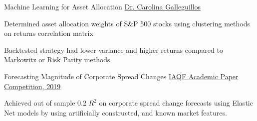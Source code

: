 \documentclass[10pt]{article}
\begin{document}
\headedsectiontwo
{Machine Learning for Asset Allocation}{}
{\href{https://www.linkedin.com/in/carolinagalleguillos/}{Dr. Carolina Galleguillos}}
{\vspace{-2.4ex}
    \begin{circlist}
	    \item Determined asset allocation weights of S\&P 500 stocks using clustering methods on returns correlation matrix
	    \item Backtested strategy had lower variance and higher returns compared to Markowitz or Risk Parity methods
    \end{circlist}
}


\headedsectionthree
{Forecasting Magnitude of Corporate Spread Changes}{}
{\href{https://www.iaqf.org/}{IAQF Academic Paper Competition, 2019}}
{\vspace{-2.4ex}
    \begin{circlist}
        \item Achieved out of sample 0.2 $R^2$ on corporate spread change forecasts using Elastic Net models by using artificially constructed, and known market features.
    \end{circlist}
}




\spacedhrule{0.8ex}{0.0ex}



\begin{indentsection}
\end{indentsection}
\end{document}
